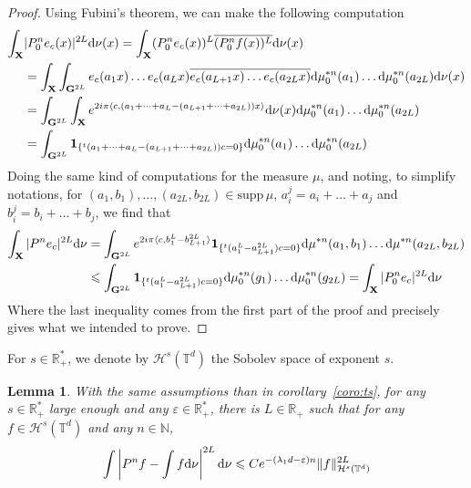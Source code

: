 \documentclass[11pt]{amsart}
\newtheorem{lemma}[theorem]{Lemma}
\theoremstyle{definition}
\theoremstyle{remark}
\numberwithin{equation}{section}
\begin{document}
\begin{proof}
Using Fubini's theorem, we can make the following computation
\begin{align*}
\int_{\mathbf X} &|P^n_0 e_c(x)|^{2L} {{\rm d}}\nu (x)=\int_{\mathbf X} (P^n_0 e_c(x))^L \overline{(P^n_0f(x))^L}{{\rm d}}\nu(x) \\
&= \int_{\mathbf X} \int_{{\mathbf G}^{2L}}e_c(a_1x) \dots e_c(a_L x) \overline{ e_c(a_{L+1}x) \dots e_c(a_{2L}x)}  {{\rm d}}\mu_0^{\ast n}(a_1) \dots {{\rm d}}\mu_0^{\ast n}(a_{2L}){{\rm d}}\nu(x) \\
&=  \int_{{\mathbf G}^{2L}} \int_{\mathbf X} e^{2i\pi \langle c,\left(a_1+ \dots + a_L - (a_{L+1} + \dots + a_{2L})\right)x\rangle} {{\rm d}}\nu(x) {{\rm d}}\mu_0^{\ast n}(a_1) \dots {{\rm d}}\mu_0^{\ast n}(a_{2L}) \\
&= \int_{{\mathbf G}^{2L}} {\mathbf{1}}_{\{^t(a_1+ \dots + a_L - (a_{L+1} + \dots + a_{2L}))c=0\}} {{\rm d}}\mu_0^{\ast n}(a_1) \dots {{\rm d}}\mu_0^{\ast n}(a_{2L}) \\
\end{align*}
Doing the same kind of computations for the measure $\mu$, and noting, to simplify notations, for $(a_1,b_1), \dots, (a_{2L}, b_{2L}) \in {\mathrm{supp}\,}\mu$, $a_i^j = a_i +\dots + a_j$ and $b_i^j = b_i + \dots + b_j$, we find that
\begin{align*}
\int_{\mathbf X} |P^n e_c|^{2L} {{\rm d}}\nu &= \int_{{\mathbf G}^{2L}} e^{2i\pi\langle c,b_1^L - b_{L+1}^{2L}\rangle}{\mathbf{1}}_{\{^t(a_1^L - a_{L+1}^{2L})c=0\}} {{\rm d}}\mu^{\ast n}(a_1,b_1) \dots {{\rm d}}\mu^{\ast n}(a_{2L},b_{2L}) \\
& \leqslant \int_{{\mathbf G}^{2L}} {\mathbf{1}}_{\{^t(a_1^L- a_{L+1}^{2L})c=0\}} {{\rm d}}\mu_0^{\ast n}(g_1) \dots {{\rm d}}\mu_0^{\ast n}(g_{2L}) =\int_{\mathbf X} |P^n_0 e_c|^{2L} {{\rm d}}\nu
\end{align*}
Where the last inequality comes from the first part of the proof and precisely gives what we intended to prove.
\end{proof}

For $s\in {\mathbb R}_+^\ast$, we denote by $\mathcal{H}^s({\mathbb T}^d)$ the Sobolev space of exponent $s$.

\begin{lemma}\label{lemme:tsregulier}
With the same assumptions than in corollary~\ref{coro:ts}, for any $s\in {\mathbb R}_+^\ast$ large enough and any $\varepsilon \in {\mathbb R}_+^\ast$, there is $L\in {\mathbb R}_+$ such that for any $f\in \mathcal{H}^s({\mathbb T}^d)$ and any $n\in {\mathbb N}$,
\[
\int \left| P^n f-\int f{{\rm d}}\nu\right|^{2L} {{\rm d}}\nu \leqslant C e^{-(\lambda_1d - \varepsilon)n} \|f\|_{\mathcal{H}^s({\mathbb T}^d)}^{2L}
\]
\end{lemma}
\end{document}
